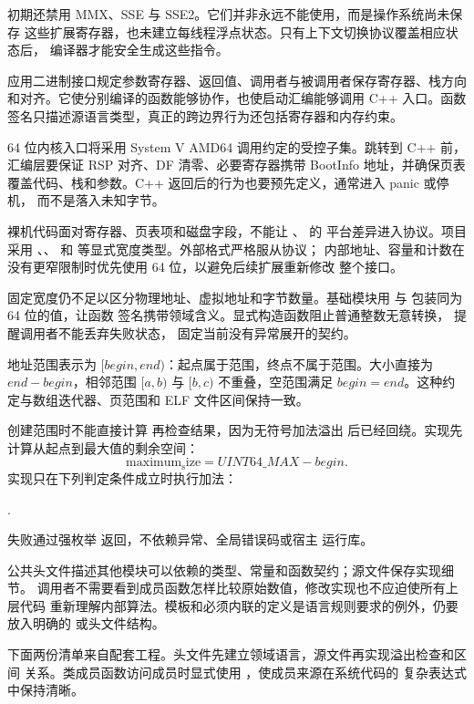 初期还禁用 MMX、SSE 与 SSE2。它们并非永远不能使用，而是操作系统尚未保存
这些扩展寄存器，也未建立每线程浮点状态。只有上下文切换协议覆盖相应状态后，
编译器才能安全生成这些指令。

应用二进制接口规定参数寄存器、返回值、调用者与被调用者保存寄存器、栈方向
和对齐。它使分别编译的函数能够协作，也使启动汇编能够调用 C++ 入口。函数
签名只描述源语言类型，真正的跨边界行为还包括寄存器和内存约束。

64 位内核入口将采用 System V AMD64 调用约定的受控子集。跳转到 C++ 前，
汇编层要保证 RSP 对齐、DF 清零、必要寄存器携带 BootInfo 地址，并确保页表
覆盖代码、栈和参数。C++ 返回后的行为也要预先定义，通常进入 panic 或停机，
而不是落入未知字节。

裸机代码面对寄存器、页表项和磁盘字段，不能让 、 的
平台差异进入协议。项目采用 、、
 和  等显式宽度类型。外部格式严格服从协议；
内部地址、容量和计数在没有更窄限制时优先使用 64 位，以避免后续扩展重新修改
整个接口。

固定宽度仍不足以区分物理地址、虚拟地址和字节数量。基础模块用
 与  包装同为 64 位的值，让函数
签名携带领域含义。显式构造函数阻止普通整数无意转换，\code{[[nodiscard]]}
提醒调用者不能丢弃失败状态， 固定当前没有异常展开的契约。

地址范围表示为 \([begin,end)\)：起点属于范围，终点不属于范围。大小直接为
\(end-begin\)，相邻范围 \([a,b)\) 与 \([b,c)\) 不重叠，空范围满足
\(begin=end\)。这种约定与数组迭代器、页范围和 ELF 文件区间保持一致。

创建范围时不能直接计算  再检查结果，因为无符号加法溢出
后已经回绕。实现先计算从起点到最大值的剩余空间：
\[
  \mathrm{maximum_size}=UINT64\_MAX-begin.
\]
实现只在下列判定条件成立时执行加法：
\begin{center}
  .
\end{center}
失败通过强枚举
 返回，不依赖异常、全局错误码或宿主
运行库。

公共头文件描述其他模块可以依赖的类型、常量和函数契约；源文件保存实现细节。
调用者不需要看到成员函数怎样比较原始数值，修改实现也不应迫使所有上层代码
重新理解内部算法。模板和必须内联的定义是语言规则要求的例外，仍要放入明确的
 或头文件结构。

下面两份清单来自配套工程。头文件先建立领域语言，源文件再实现溢出检查和区间
关系。类成员函数访问成员时显式使用 ，使成员来源在系统代码的
复杂表达式中保持清晰。

